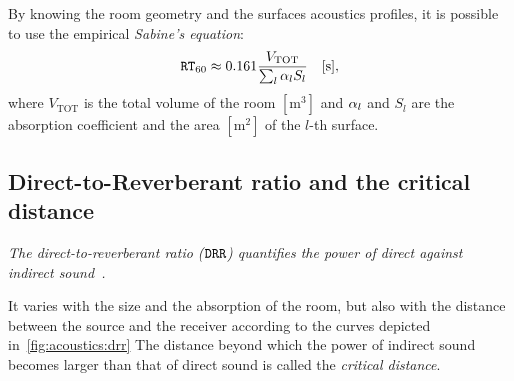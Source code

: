By knowing the room geometry and the surfaces acoustics profiles,
it is possible to use the empirical \textit{Sabine's equation}:
\begin{equation}
    \mathtt{RT}_{60}
    \approx 0.161 \frac{V_{\text{TOT}}}{\sum_l \alpha_l S_l} \hspace{1em} [\si{\second}]
    ,
\end{equation}
where $V_{\text{TOT}}$ is the total volume of the room $[\si{\metre^3}]$ and $\alpha_l$ and $S_l$ are the
absorption coefficient and the area $[\si{\metre^2}]$  of the $l$-th surface.

\subsection{Direct-to-Reverberant ratio and the critical distance}\label{ch:acoustics:subsec:drr}
\begin{center}
    \textit{The direct-to-reverberant ratio ($\mathtt{DRR}$) quantifies the power of direct against indirect sound~.}
\end{center}
It varies with the size and the absorption of the room, but also with the distance between the source and the receiver according to the curves
depicted in~\cref{fig:acoustics:drr}
The distance beyond which the power of indirect sound becomes larger than that of direct sound is called the \textit{critical distance}.

